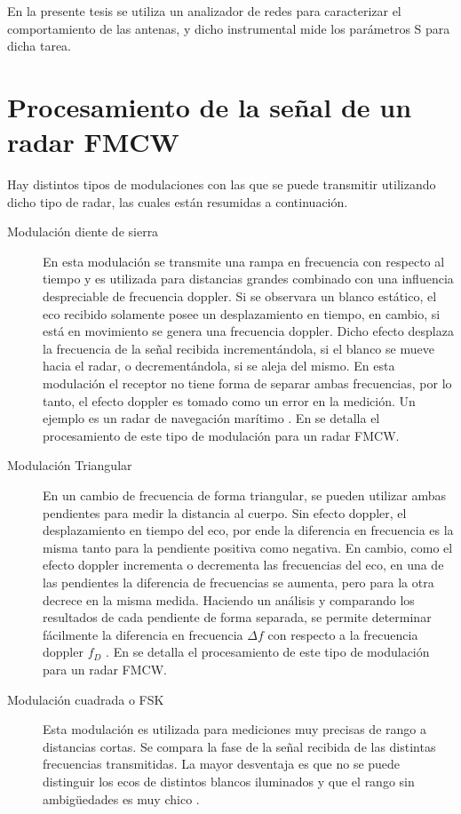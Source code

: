 En la presente tesis se utiliza un analizador de redes para caracterizar el comportamiento de las antenas, y dicho instrumental mide los parámetros S para dicha tarea.


\section{Procesamiento de la señal de un radar FMCW}

Hay distintos tipos de modulaciones con las que se puede transmitir utilizando dicho tipo de radar, las cuales están resumidas a continuación.

\begin{description}

\item[Modulación diente de sierra] En esta modulación se transmite una rampa en frecuencia con respecto al tiempo y es utilizada para distancias grandes combinado con una influencia despreciable de frecuencia doppler. Si se observara un blanco estático, el eco recibido solamente posee un desplazamiento en tiempo, en cambio, si está en movimiento se genera una frecuencia doppler. Dicho efecto desplaza la frecuencia de la señal recibida incrementándola, si el blanco se mueve hacia el radar, o decrementándola, si se aleja del mismo. En esta modulación el receptor no tiene forma de separar ambas frecuencias, por lo tanto, el efecto doppler es tomado como un error en la medición. Un ejemplo es un radar de navegación marítimo \cite{Basics2015}. En \cite{Varavin2007a, Shen} se detalla el procesamiento de este tipo de modulación para un radar FMCW.

\item[Modulación Triangular] En un cambio de frecuencia de forma triangular, se pueden utilizar ambas pendientes para medir la distancia al cuerpo. Sin efecto doppler, el desplazamiento en tiempo del eco, por ende la diferencia en frecuencia es la misma tanto para la pendiente positiva como negativa. En cambio, como el efecto doppler incrementa o decrementa las frecuencias del eco, en una de las pendientes la diferencia de frecuencias se aumenta, pero para la otra decrece en la misma medida. Haciendo un análisis y comparando los resultados de cada pendiente de forma separada, se permite determinar fácilmente la diferencia en frecuencia $\Delta f$ con respecto a la frecuencia doppler $f_D$ \cite{Basics2015}. En \cite{Chang2006, Kurt2007} se detalla el procesamiento de este tipo de modulación para un radar FMCW.

\item[Modulación cuadrada o FSK] Esta modulación es utilizada para mediciones muy precisas de rango a distancias cortas. Se compara la fase de la señal recibida de las distintas frecuencias transmitidas. La mayor desventaja es que no se puede distinguir los ecos de distintos blancos iluminados y que el rango sin ambigüedades es muy chico \cite{Basics2015}.


\end{description}
